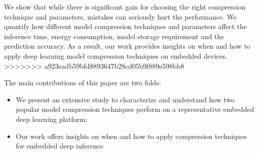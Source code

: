 We show that while there is significant gain for choosing the right compression technique and parameters, mistakes can seriously hurt the
performance. We quantify how different model compression techniques and parameters affect the inference time, energy consumption, model
storage requirement and the prediction accuracy. As a result, our work provides insights on when and how to apply deep learning model
compression techniques on embedded devices.
>>>>>>> a923eadb59bfd8893647b28cd05b9f889e598bb8

The main contributions of this paper are two folds:

\begin{itemize}
\item We present an extensive study to characterize and understand how two popular model compression techniques perform on a
    representative embedded deep learning platform;
\item Our work offers insights on when and how to apply compression techniques for embedded deep inference.
\end{itemize}
